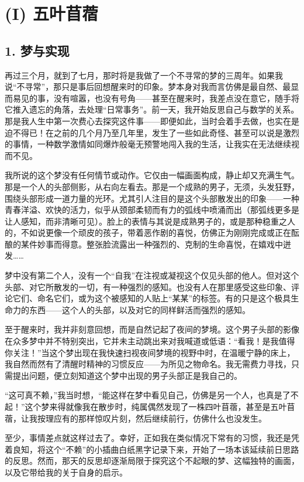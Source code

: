 \section{(I) 五叶苜蓿}

\subsection*{1. 梦与实现}

再过三个月，就到了七月，那时将是我做了一个不寻常的梦的三周年。如果我说“不寻常”，那只是事后回想醒来时的印象。梦本身对我而言仿佛是最自然、最显而易见的事，没有喧嚣，也没有号角——甚至在醒来时，我差点没在意它，随手将它推入遗忘的角落，去处理“日常事务”。前一天，我开始反思自己与数学的关系。那是我人生中第一次费心去探究这件事——即便如此，当时会着手去做，也实在是迫不得已！在之前的几个月乃至几年里，发生了一些如此奇怪、甚至可以说是激烈的事情，一种数学激情如同爆炸般毫无预警地闯入我的生活，让我实在无法继续视而不见。

我所说的这个梦没有任何情节或动作。它仅由一幅画面构成，静止却又充满生气。那是一个人的头部侧影，从右向左看去。那是一个成熟的男子，无须，头发狂野，围绕头部形成一道力量的光环。尤其引人注目的是这个头部散发出的印象——一种青春洋溢、欢快的活力，似乎从颈部柔韧而有力的弧线中喷涌而出（那弧线更多是让人感知，而非清晰可见）。脸上的表情与其说是成熟男子的，或是那种稳重之人的，不如说更像一个顽皮的孩子，带着恶作剧的喜悦，仿佛正为刚刚完成或正在酝酿的某件妙事而得意。整张脸流露出一种强烈的、克制的生命喜悦，在嬉戏中迸发……

梦中没有第二个人，没有一个“自我”在注视或凝视这个仅见头部的他人。但对这个头部、对它所散发的一切，有一种强烈的感知。也没有人在那里感受这些印象、评论它们、命名它们，或为这个被感知的人贴上“某某”的标签。有的只是这个极具生命力的东西——这个人的头部，以及对它的同样鲜活而强烈的感知。

至于醒来时，我并非刻意回想，而是自然记起了夜间的梦境。这个男子头部的影像在众多梦中并不特别突出，它并未主动跳出来对我喊道或低语：“看我！是我值得你关注！”当这个梦出现在我快速扫视夜间梦境的视野中时，在温暖宁静的床上，我自然而然有了清醒时精神的习惯反应——为所见之物命名。我无需费力寻找，只需提出问题，便立刻知道这个梦中出现的男子头部正是我自己的。

“这可真不赖，”我当时想，“能这样在梦中看见自己，仿佛是另一个人，也真是了不起！”这个梦来得就像我在散步时，纯属偶然发现了一株四叶苜蓿，甚至是五叶苜蓿，让我按理应有的那样惊叹片刻，然后继续前行，仿佛什么也没发生。

至少，事情差点就这样过去了。幸好，正如我在类似情况下常有的习惯，我还是凭着良知，将这个“不赖”的小插曲白纸黑字记录下来，开始了一场本该延续前日思路的反思。然而，那天的反思却逐渐局限于探究这个不起眼的梦、这幅独特的画面，以及它带给我的关于自身的启示。

